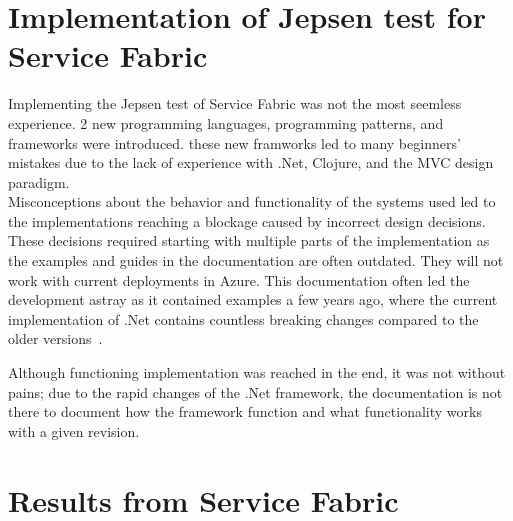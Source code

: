 \documentclass[a4paper,10pt,titlepage]{report}
\begin{document}
\section{Implementation of Jepsen test for Service Fabric}

Implementing the Jepsen test of Service Fabric was not the most seemless experience. 2 new programming languages, programming patterns, and frameworks were introduced. these new framworks led to many beginners' mistakes due to the lack of experience with .Net, Clojure, and the MVC design paradigm. 
\\ \vspace{5mm}
Misconceptions about the behavior and functionality of the systems used led to the implementations reaching a blockage caused by incorrect design decisions. These decisions required starting with multiple parts of the implementation as the examples and guides in the documentation are often outdated. They will not work with current deployments in Azure. This documentation often led the development astray as it contained examples a few years ago, where the current implementation of .Net contains countless breaking changes compared to the older versions~\cite{breakingchangesdotnet}. 
\\ \vspace{5mm}

 Although functioning implementation was reached in the end, it was not without pains; due to the rapid changes of the .Net framework, the documentation is not there to document how the framework function and what functionality works with a given revision.

\section{Results from Service Fabric}
\end{document}
